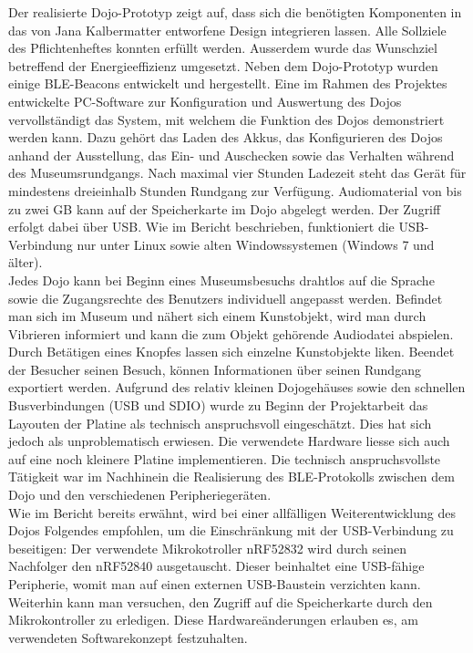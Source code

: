 Der realisierte Dojo-Prototyp zeigt auf, dass sich die benötigten Komponenten in das von Jana Kalbermatter entworfene Design integrieren lassen.  Alle Sollziele des Pflichtenheftes konnten erfüllt werden. Ausserdem wurde das Wunschziel betreffend der Energieeffizienz umgesetzt. Neben dem Dojo-Prototyp wurden einige BLE-Beacons entwickelt und hergestellt. Eine im Rahmen des Projektes entwickelte PC-Software zur Konfiguration und Auswertung des Dojos vervollständigt das System, mit welchem die Funktion des Dojos demonstriert werden kann. Dazu gehört das Laden des Akkus, das Konfigurieren des Dojos anhand der Ausstellung, das Ein- und Auschecken sowie das Verhalten während des Museumsrundgangs. Nach maximal vier Stunden Ladezeit steht das Gerät für mindestens dreieinhalb Stunden Rundgang zur Verfügung. Audiomaterial von bis zu zwei GB kann auf der Speicherkarte im Dojo abgelegt werden. Der Zugriff erfolgt dabei über USB. Wie im Bericht beschrieben, funktioniert die USB-Verbindung nur unter Linux sowie alten Windowssystemen (Windows 7 und älter).\\ Jedes Dojo kann bei Beginn eines Museumsbesuchs drahtlos auf die Sprache sowie die Zugangsrechte des Benutzers individuell angepasst werden. Befindet man sich im Museum und nähert sich einem Kunstobjekt, wird man durch Vibrieren informiert und kann die zum Objekt gehörende Audiodatei abspielen. Durch Betätigen eines Knopfes lassen sich einzelne Kunstobjekte liken. Beendet der Besucher seinen Besuch, können Informationen über seinen Rundgang exportiert werden. 
Aufgrund des relativ kleinen Dojogehäuses sowie den schnellen Busverbindungen (USB und SDIO) wurde zu Beginn der Projektarbeit das Layouten der Platine als technisch anspruchsvoll eingeschätzt. Dies hat sich jedoch als unproblematisch erwiesen. Die verwendete Hardware liesse sich auch auf eine noch kleinere Platine implementieren. Die technisch anspruchsvollste Tätigkeit war im Nachhinein die Realisierung des BLE-Protokolls zwischen dem Dojo und den verschiedenen Peripheriegeräten.\\
Wie im Bericht bereits erwähnt, wird bei einer allfälligen Weiterentwicklung des Dojos Folgendes empfohlen, um die Einschränkung mit der USB-Verbindung zu beseitigen: Der verwendete Mikrokotroller nRF52832 wird durch seinen Nachfolger den nRF52840 ausgetauscht. Dieser beinhaltet eine USB-fähige Peripherie, womit man auf einen externen USB-Baustein verzichten kann. Weiterhin kann man versuchen, den Zugriff auf die Speicherkarte durch den Mikrokontroller zu erledigen. Diese Hardwareänderungen erlauben es, am verwendeten Softwarekonzept festzuhalten.\\
